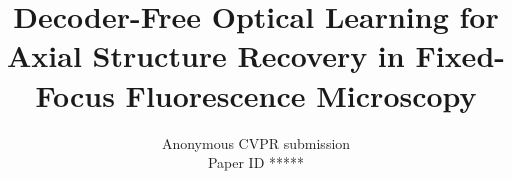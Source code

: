 \def\paperID{*****}
\def\confName{CVPR}
\def\confYear{2027}
\newcommand{\TITLE}{Decoder-Free Optical Learning for Axial Structure Recovery in Fixed-Focus Fluorescence Microscopy}
\title{\TITLE}
\author{Anonymous CVPR submission\\Paper ID \paperID}
